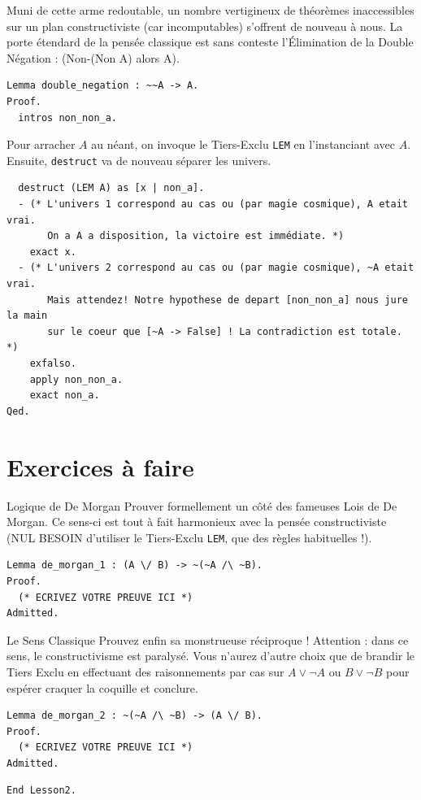 \documentclass[11pt,a4paper]{article}
\begin{document}
Muni de cette arme redoutable, un nombre vertigineux de théorèmes inaccessibles sur un plan constructiviste (car incomputables) s'offrent de nouveau à nous. La porte étendard de la pensée classique est sans conteste l'Élimination de la Double Négation : (Non-(Non A) alors A).

\begin{lstlisting}
Lemma double_negation : ~~A -> A.
Proof.
  intros non_non_a.
\end{lstlisting}

Pour arracher $A$ au néant, on invoque le Tiers-Exclu \texttt{LEM} en l'instanciant avec $A$. Ensuite, \texttt{destruct} va de nouveau séparer les univers.

\begin{lstlisting}
  destruct (LEM A) as [x | non_a].
  - (* L'univers 1 correspond au cas ou (par magie cosmique), A etait vrai.
       On a A a disposition, la victoire est immédiate. *)
    exact x.
  - (* L'univers 2 correspond au cas ou (par magie cosmique), ~A etait vrai.
       Mais attendez! Notre hypothese de depart [non_non_a] nous jure la main
       sur le coeur que [~A -> False] ! La contradiction est totale. *)
    exfalso.
    apply non_non_a.
    exact non_a.
Qed.
\end{lstlisting}

\section{Exercices à faire}

\begin{exercice}{Logique de De Morgan}{}
  Prouver formellement un côté des fameuses Lois de De Morgan. Ce sens-ci est tout à fait harmonieux avec la pensée constructiviste (NUL BESOIN d'utiliser le Tiers-Exclu \texttt{LEM}, que des règles habituelles !).

\begin{lstlisting}
Lemma de_morgan_1 : (A \/ B) -> ~(~A /\ ~B).
Proof.
  (* ECRIVEZ VOTRE PREUVE ICI *)
Admitted.
\end{lstlisting}
\end{exercice}

\begin{exercice}{Le Sens Classique}{}
  Prouvez enfin sa monstrueuse réciproque ! Attention : dans ce sens, le constructivisme est paralysé. Vous n'aurez d'autre choix que de brandir le Tiers Exclu en effectuant des raisonnements par cas sur $A \lor \neg A$ ou $B \lor \neg B$ pour espérer craquer la coquille et conclure.

\begin{lstlisting}
Lemma de_morgan_2 : ~(~A /\ ~B) -> (A \/ B).
Proof.
  (* ECRIVEZ VOTRE PREUVE ICI *)
Admitted.
\end{lstlisting}
\end{exercice}

\begin{lstlisting}
End Lesson2.
\end{lstlisting}
\end{document}
